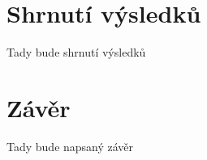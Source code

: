 
\chapter[Shrnutí výsledků]{Shrnutí výsledků}

Tady bude shrnutí výsledků

\chapter[Závěr]{Závěr}


Tady bude napsaný závěr